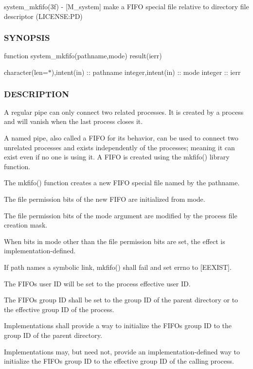 system\+\_\+mkfifo(3f) -\/ \mbox{[}M\+\_\+system\mbox{]} make a F\+I\+FO special file relative to directory file descriptor (L\+I\+C\+E\+N\+SE\+:PD) \subsubsection*{S\+Y\+N\+O\+P\+S\+IS}

function system\+\_\+mkfifo(pathname,mode) result(ierr)

character(len=$\ast$),intent(in) \+:\+: pathname integer,intent(in) \+:\+: mode integer \+:\+: ierr

\subsubsection*{D\+E\+S\+C\+R\+I\+P\+T\+I\+ON}

A regular pipe can only connect two related processes. It is created by a process and will vanish when the last process closes it.

A named pipe, also called a F\+I\+FO for its behavior, can be used to connect two unrelated processes and exists independently of the processes; meaning it can exist even if no one is using it. A F\+I\+FO is created using the mkfifo() library function.

The mkfifo() function creates a new F\+I\+FO special file named by the pathname.

The file permission bits of the new F\+I\+FO are initialized from mode.

The file permission bits of the mode argument are modified by the process\textquotesingle{} file creation mask.

When bits in mode other than the file permission bits are set, the effect is implementation-\/defined.

If path names a symbolic link, mkfifo() shall fail and set errno to \mbox{[}E\+E\+X\+I\+ST\mbox{]}.

The F\+I\+FO\textquotesingle{}s user ID will be set to the process\textquotesingle{} effective user ID.

The F\+I\+FO\textquotesingle{}s group ID shall be set to the group ID of the parent directory or to the effective group ID of the process.

Implementations shall provide a way to initialize the F\+I\+FO\textquotesingle{}s group ID to the group ID of the parent directory.

Implementations may, but need not, provide an implementation-\/defined way to initialize the F\+I\+FO\textquotesingle{}s group ID to the effective group ID of the calling process.

